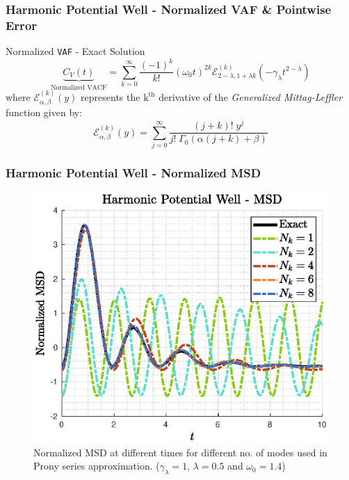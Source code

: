 \documentclass[a4paper,10pt]{beamer}
\newcommand{\rb}[1]{\left( #1 \right)}
\begin{document}
	\begin{frame}
		\frametitle{\large Harmonic Potential Well - Normalized VAF \& Pointwise Error}
		\begin{alertblock}{Normalized \texttt{VAF} - Exact Solution}
			$$ \underbrace{C_{V}(t)}_{\text{Normalized VACF}} = \sum_{k=0}^{\infty} \frac{\rb{-1}^{k}}{k!} \rb{\omega_{0} t}^{2k} \mathscr{E}_{2-\lambda,1+\lambda k}^{(k)}\rb{-\gamma_{\lambda} t^{2-\lambda}}$$
			where $\mathscr{E}_{\alpha,\beta}^{(k)}\rb{y}$ represents the $\text{k}^{\text{th}}$ derivative of the \textit{Generalized Mittag-Leffler} function given by:
			$$ \mathscr{E}_{\alpha,\beta}^{(k)} \rb{y} = \sum_{j=0}^{\infty} \frac{\rb{j+k}! \; y^{j}}{j! \; \Gamma_{0}\rb{\alpha(j+k)+\beta}}$$
		\end{alertblock}
	\end{frame}

	\begin{frame}
		\frametitle{Harmonic Potential Well - Normalized MSD}
		\begin{figure}[H]
			\includegraphics[width=0.725\linewidth]{./Plots/MSD/MSDCompare.eps}
			\caption{Normalized MSD at different times for different no. of modes used in Prony series approximation. ($\gamma_{\lambda} = 1$, $\lambda = 0.5$ and $\omega_{0} = 1.4$)}
		\end{figure}
	\end{frame}
	
\end{document}
